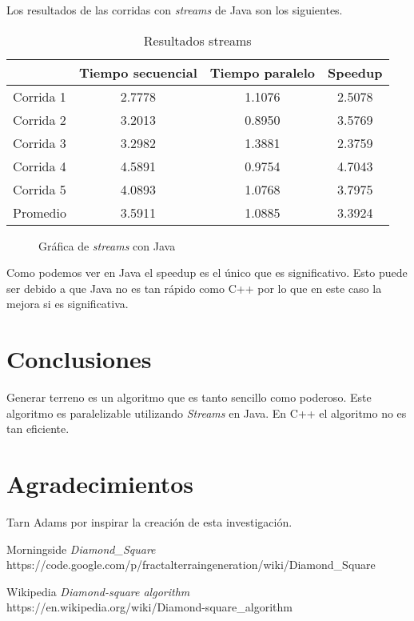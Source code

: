 \documentclass[10pt,letterpaper,oneside]{article}
\begin{document}
Los resultados de las corridas con \textit{streams} de Java son los siguientes.

\begin{table}[H]
	\centering
	\begin{tabular}{|c|c|c|c|}
		\hline
			& Tiempo secuencial & Tiempo paralelo & Speedup \\
		\hline
			Corrida 1 & 2.7778 & 1.1076 & 2.5078 \\
			Corrida 2 & 3.2013 & 0.8950 & 3.5769 \\
			Corrida 3 & 3.2982 & 1.3881 & 2.3759 \\
			Corrida 4 & 4.5891 & 0.9754 & 4.7043 \\
			Corrida 5 & 4.0893 & 1.0768 & 3.7975 \\
		\hline
			Promedio  & 3.5911 & 1.0885 & 3.3924 \\
		\hline
	\end{tabular}
	\caption{Resultados streams}
	\label{tab:streams}
\end{table}

\begin{figure}[H]
	\centering
	\caption{Gráfica de \textit{streams} con Java}
	\label{fig:plot_stream}	
\end{figure}

Como podemos ver en Java el speedup es el único que es significativo. Esto puede ser debido a que Java no es tan rápido como C++ por lo que en este caso la mejora si es significativa. 

\section{Conclusiones}

Generar terreno es un algoritmo que es tanto sencillo como poderoso. Este algoritmo es paralelizable utilizando \textit{Streams} en Java. En C++ el algoritmo no es tan eficiente. 

\section{Agradecimientos}

Tarn Adams por inspirar la creación de esta investigación.
 
\begin{thebibliography}{9}
    
    Morningside 
    \emph{Diamond\_Square} \\
    https://code.google.com/p/fractalterraingeneration/wiki/Diamond\_Square
    
    Wikipedia
    \emph{Diamond-square algorithm} \\
    https://en.wikipedia.org/wiki/Diamond-square\_algorithm

\end{thebibliography}
\end{document}
